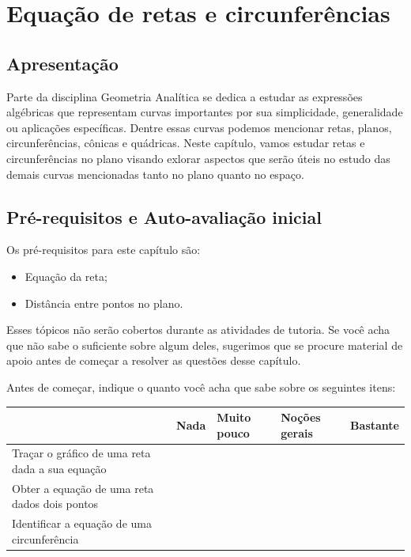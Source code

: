 \documentclass[main_estudante.tex]{subfiles}
\begin{document}
\chapter{Equação de retas e circunferências}

\section{Apresentação}

Parte da disciplina Geometria Analítica se dedica a estudar as expressões algébricas que representam  curvas importantes por sua simplicidade, generalidade ou aplicações específicas. Dentre essas curvas podemos mencionar retas, planos, circunferências, cônicas e quádricas. Neste capítulo, vamos estudar retas e circunferências no plano visando exlorar aspectos que serão úteis no estudo das demais curvas mencionadas tanto no plano quanto no espaço.

\section{Pré-requisitos e Auto-avaliação inicial}

Os pré-requisitos para este capítulo são:
\begin{itemize}
 \item Equação da reta;
 \item Distância entre pontos no plano.
\end{itemize}

Esses tópicos não serão cobertos durante as atividades de tutoria. Se você acha que não sabe o suficiente sobre algum deles, sugerimos que se procure material de apoio antes de começar a resolver as questões desse capítulo.

Antes de começar, indique o quanto você acha que sabe sobre os seguintes itens:

\begin{center}
 \begin{tabular}{|p{35mm}||p{15mm}|p{15mm}|p{15mm}|p{15mm}|} 
 \hline
   & Nada & Muito pouco & Noções gerais & Bastante\\
 \hline
 Traçar o gráfico de uma reta dada a sua equação &  &  &  &  \\ 
 \hline
 Obter a equação de uma reta dados dois pontos &  &  &  &  \\
 \hline
 Identificar a equação de uma circunferência &  &  &  &  \\
 \hline
\end{tabular}
\end{center}
\end{document}
